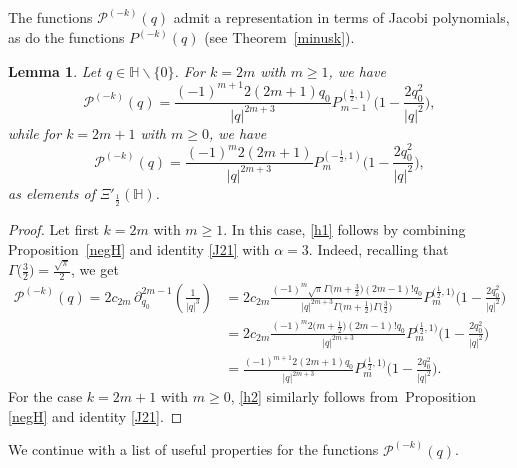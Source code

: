 \documentclass[reqno,11pt]{amsart}
\newtheorem{lemma}[theorem]{Lemma}
\theoremstyle{definition}
\begin{document}
The functions $ \mathcal{P}^{(-k)}(q)$ admit a representation in terms of Jacobi polynomials, as do the functions $P^{(-k)}(q)$ (see Theorem~\ref{minusk}).

\begin{lemma}
Let $q \in \mathbb{H}\backslash \{0\}$. For $k=2m$ with $m \geq 1$, we have
\begin{equation}
\label{h1}
\mathcal{P}^{(-k)}(q)= \frac{(-1)^{m+1}2(2m+1) q_0}{|q|^{2m+3}}P_{m-1}^{(\frac{1}{2},1 )}\bigg(1-\frac{2q_0^2}{|q|^2}\bigg),
\end{equation}
while for $k=2m+1$ with $m \geq 0$, we have
\begin{equation}
	\label{h2}
\mathcal{P}^{(-k)}(q)=\frac{(-1)^m2(2m+1)}{|q|^{2m+3}}P_{m}^{(-\frac{1}{2},1)}\bigg(1-\frac{2q_0^2}{|q|^2}\bigg),
\end{equation}
as elements of $\Xi'_{\frac{1}{2}}(\mathbb{H})$.
\end{lemma}
\begin{proof}
Let first $k=2m$ with $m \geq 1$. In this case, \eqref{h1} follows by combining Proposition~\ref{negH} and identity \eqref{J21} with $\alpha=3$.  Indeed, recalling that $\Gamma\big(\frac{3}{2}\big)=\frac{\sqrt{\pi}}{2}$, we get
\begin{align*}
\mathcal{P}^{(-k)}(q)= 2c_{2m} \, \partial_{q_0}^{2m-1} \left( \frac{1}{|q|^{3}}\right)& = 2c_{2m}\frac{(-1)^m \sqrt{\pi}\Gamma\big(m+\frac{3}{2}\big) (2m-1)! q_0}{|q|^{2m+3}\Gamma\big(m+\frac{1}{2}\big) \Gamma\big(\frac{3}{2}\big)} P_m^{\big(\frac{1}{2},1\big)}\bigg(1-\frac{2q_0^2}{|q|^2}\bigg)\\
&=2c_{2m}\frac{(-1)^m 2\big(m+\frac{1}{2}\big) (2m-1)! q_0}{|q|^{2m+3} } P_m^{\big(\frac{1}{2},1\big)}\bigg(1-\frac{2q_0^2}{|q|^2}\bigg)\\
& = \frac{(-1)^{m+1} 2(2m+1) q_0}{|q|^{2m+3} } P_m^{\big(\frac{1}{2},1\big)}\bigg(1-\frac{2q_0^2}{|q|^2}\bigg).
\end{align*}
For the case $k=2m+1$ with $m \geq 0$, \eqref{h2} similarly follows from~Proposition \ref{negH} and identity \eqref{J21}.
\end{proof}


We continue with a list of useful properties for the functions $ \mathcal{P}^{(-k)}(q)$.
\end{document}
